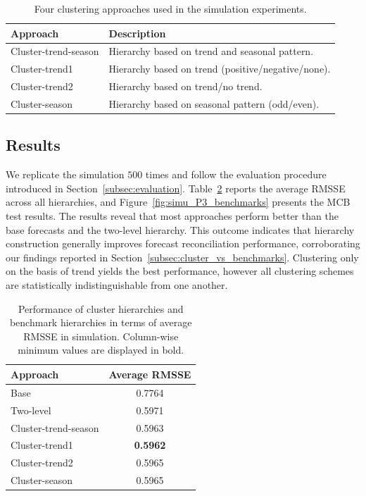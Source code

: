 \documentclass[a4paper,review,12pt,authoryear]{elsarticle}
\begin{document}
\begin{table}[h!]
    \centering
    \caption{\label{tab:simu_methods}Four clustering approaches used in the simulation experiments.}
    \begin{tabular}{ll}\toprule
        Approach & Description \\ \midrule
        Cluster-trend-season & Hierarchy based on trend and seasonal pattern. \\
        Cluster-trend1 &  Hierarchy based on trend (positive/negative/none). \\
        Cluster-trend2 & Hierarchy based on trend/no trend. \\
        Cluster-season & Hierarchy based on seasonal pattern (odd/even). \\\bottomrule
    \end{tabular}
    \label{tab:7}
\end{table}



\subsection{Results}
\label{sec:simu_res}

We replicate the simulation $500$ times and follow the evaluation procedure introduced in Section~\ref{subsec:evaluation}.
Table~\ref{tab:simu_P3} reports the average RMSSE across all hierarchies, and
Figure~\ref{fig:simu_P3_benchmarks} presents the MCB test results. The results reveal that most approaches perform better than the base forecasts and the two-level hierarchy. This outcome indicates that hierarchy construction generally improves forecast reconciliation performance, corroborating our findings reported in Section~\ref{subsec:cluster_vs_benchmarks}. 
Clustering only on the basis of trend yields the best performance, however all clustering schemes are statistically indistinguishable from one another. 


\begin{table}[h!]
    \centering
    \caption{\label{tab:simu_P3}Performance of cluster hierarchies and benchmark hierarchies in terms of average RMSSE in simulation. Column-wise minimum values are displayed in bold.}
    \begin{tabular}{lc}\toprule
        Approach & Average RMSSE \\ \midrule
        Base & 0.7764 \\ 
        Two-level & 0.5971 \\ 
        Cluster-trend-season & 0.5963 \\ 
        Cluster-trend1 & \textbf{0.5962} \\ 
        Cluster-trend2 & 0.5965 \\ 
        Cluster-season & 0.5965 \\ \bottomrule
    \end{tabular}
\end{table}
\end{document}
